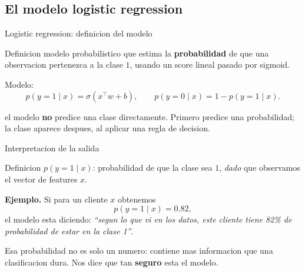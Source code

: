 \subsection{El modelo logistic regression}

\begin{frame}{Logistic regression: definicion del modelo}
\begin{block}{Definicion}
\small
{} modelo probabilistico que estima la \textbf{probabilidad} de que una observacion pertenezca a la clase $1$, usando un score lineal pasado por sigmoid.
\end{block}

\vspace{0.3em}
Modelo:
\[
p(y=1 \mid x) = \sigma(x^\top w + b), \qquad
p(y=0 \mid x) = 1 - p(y=1\mid x).
\]

\vspace{0.3em}
 el modelo \textbf{no} predice una clase directamente. Primero predice una probabilidad; la clase aparece despues, al aplicar una regla de decision.
\end{frame}

\begin{frame}{Interpretacion de la salida}
\begin{block}{Definicion}
\small
{} $p(y=1\mid x)$: probabilidad de que la clase sea $1$, \emph{dado} que observamos el vector de features $x$.
\end{block}

\vspace{0.3em}
\textbf{Ejemplo.} Si para un cliente $x$ obtenemos
\[
p(y=1\mid x) = 0.82,
\]
el modelo esta diciendo: \emph{``segun lo que vi en los datos, este cliente tiene 82\% de probabilidad de estar en la clase 1''}.

\vspace{0.3em}
Esa probabilidad no es solo un numero: contiene mas informacion que una clasificacion dura. Nos dice que tan \textbf{seguro} esta el modelo.
\end{frame}

